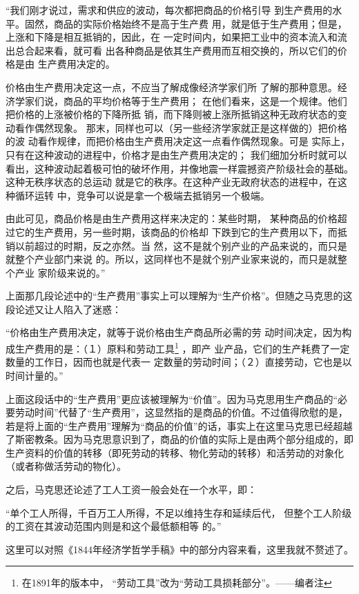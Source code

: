 \documentclass[a4paper,twoside,12pt,AutoFakeBold]{ctexart}
\begin{document}
\begin{adjustwidth}{2em}{2em}
    \qquad\fangsong
    “我们刚才说过，需求和供应的波动，每次都把商品的价格引导
到生产费用的水平。固然，商品的实际价格始终不是高于生产费
用，就是低于生产费用；但是，上涨和下降是相互抵销的，因此，在
一定时间内，如果把工业中的资本流入和流出总合起来看，就可看
出各种商品是依其生产费用而互相交换的，所以它们的价格是由
生产费用决定的。

价格由生产费用决定这一点，不应当了解成像经济学家们所
了解的那种意思。经济学家们说，商品的平均价格等于生产费用；
在他们看来，这是一个规律。他们把价格的上涨被价格的下降所抵
销，而下降则被上涨所抵销这种无政府状态的变动看作偶然现象。
那末，同样也可以（另一些经济学家就正是这样做的）把价格的波
动看作规律，而把价格由生产费用决定这一点看作偶然现象。可是
实际上，只有在这种波动的进程中，价格才是由生产费用决定的；
我们细加分析时就可以看出，这种波动起着极可怕的破坏作用，并像地震一样震撼资产阶级社会的基础。这种无秩序状态的总运动
就是它的秩序。在这种产业无政府状态的进程中，在这种循环运转
中，竞争可以说是拿一个极端去抵销另一个极端。

由此可见，商品价格是由生产费用这样来决定的：某些时期，
某种商品的价格超过它的生产费用，另一些时期，该商品的价格却
下跌到它的生产费用以下，而抵销以前超过的时期，反之亦然。当
然，这不是就个别产业的产品来说的，而只是就整个产业部门来说
的。所以，这同样也不是就个别产业家来说的，而只是就整个产业
家阶级来说的。”
\end{adjustwidth}
上面那几段论述中的“生产费用”事实上可以理解为“生产价格”。但随之马克思的这段论述又让人陷入了迷惑：
\begin{adjustwidth}{2em}{2em}
    \qquad\fangsong
    “价格由生产费用决定，就等于说价格由生产商品所必需的劳
动时间决定，因为构成生产费用的是：（１）原料和劳动工具\footnote{在1891年的版本中， “劳动工具”改为“劳动工具损耗部分”。——编者注} ，即产
业产品，它们的生产耗费了一定数量的工作日，因而也就是代表一
定数量的劳动时间；（２）直接劳动，它也是以时间计量的。”
\end{adjustwidth}

上面这段话中的“生产费用”更应该被理解为“价值”。因为马克思用生产商品的“必要劳动时间”代替了“生产费用”，这显然指的是商品的价值。不过值得欣慰的是，若是将上面的“生产费用”理解为“商品的价值”的话，事实上在这里马克思已经超越了斯密教条。因为马克思意识到了，商品的价值的实际上是由两个部分组成的，即生产资料的价值的转移（即死劳动的转移、物化劳动的转移）和活劳动的对象化（或者称做活劳动的物化）。

之后，马克思还论述了工人工资一般会处在一个水平，即：
\begin{adjustwidth}{2em}{2em}
\qquad\fangsong
“单个工人所得，千百万工人所得，不足以维持生存和延续后代，
但整个工人阶级的工资在其波动范围内则是和这个最低额相等
的。”
\end{adjustwidth}
这里可以对照《1844年经济学哲学手稿》中的部分内容来看，这里我就不赘述了。
\end{document}
